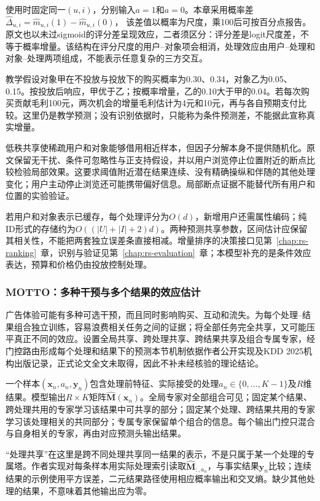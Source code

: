 使用时固定同一$(u,i)$，分别输入$a=1$和$a=0$。本章采用概率差
$\widehat\Delta_{u,i}=\widehat m_{u,i}(1)-\widehat m_{u,i}(0)$，
该差值以概率为尺度，乘100后可按百分点报告。原文也以未过sigmoid的评分差呈现效应，二者须区分：评分差是logit尺度差，不等于概率增量。该结构在评分尺度的用户--对象项会相消，处理效应由用户--处理和对象--处理两项组成，不能表示任意复杂的三方交互。

教学假设对象甲在不投放与投放下的购买概率为0.30、0.34，对象乙为0.05、0.15。按投放后响应，甲优于乙；按概率增量，乙的0.10大于甲的0.04。若每次购买贡献毛利100元，两次机会的增量毛利估计为4元和10元，再与各自预期支付比较。这里仍是教学预测；没有识别依据时，只能称为条件预测差，不能据此宣称真实增量。

低秩共享使稀疏用户和对象能够借用相近样本，但因子分解本身不提供随机化。原文保留无干扰、条件可忽略性与正支持假设，并以用户浏览停止位置附近的断点比较检验局部效果。这要求阈值附近潜在结果连续、没有精确操纵和伴随的其他处理变化；用户主动停止浏览还可能携带偏好信息。局部断点证据不能替代所有用户和位置的实验验证。

若用户和对象表示已缓存，每个处理评分为$O(d)$，新增用户还需属性编码；纯ID形式的存储约为$O((|U|+|I|+2)d)$。两种预测共享参数，区间估计应保留其相关性，不能把两套独立误差条直接相减。增量排序的决策接口见第~\ref{chap:rs-ranking}~章，识别与验证见第~\ref{chap:rs-evaluation}~章；本模型补充的是条件效应表达，预算和价格仍由投放控制处理。

\Needspace{90mm}
\subsubsection{MOTTO：多种干预与多个结果的效应估计}
\label{sec:rs-advertising-motto}

广告体验可能有多种可选干预，而且同时影响购买、互动和流失。为每个处理--结果组合独立训练，容易浪费相关任务之间的证据；将全部任务完全共享，又可能压平真正不同的效应。设置全局共享、跨处理共享、跨结果共享及组合专属专家，经门控路由形成每个处理和结果下的预测本节机制依据作者公开实现及KDD 2025机构出版记录，正式论文全文未取得，因此不补未经核验的理论结论。

一个样本$(\bm{x}_n,a_n,\bm{y}_n)$包含处理前特征、实际接受的处理$a_n\in\{0,\ldots,K-1\}$及$R$维结果。模型输出$R\times K$矩阵$\widehat{\bm M}(\bm{x}_n)$。全局专家对全部组合可见；固定某个结果、跨处理共用的专家学习该结果中可共享的部分；固定某个处理、跨结果共用的专家学习该处理相关的共同部分；专属专家保留单个组合的信息。每个输出门控只混合与自身相关的专家，再由对应预测头输出结果。

“处理共享”在这里是跨不同处理共享同一结果的表示，不是只属于某一个处理的专属塔。作者实现对每条样本用实际处理索引读取$\widehat{\bm M}_{:,a_n}$，与事实结果$\bm y_n$比较；连续结果的示例使用平方误差，二元结果路径使用相应概率输出和交叉熵。缺少其他处理的结果，不意味着其他输出应为零。

